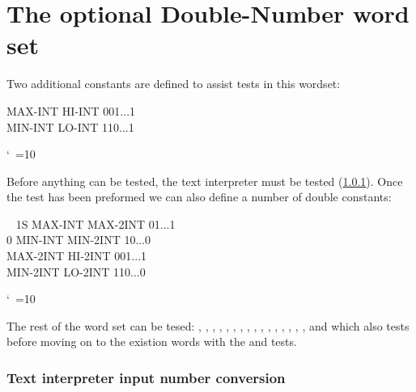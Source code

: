

\section{The optional Double-Number word set} %

\cbstart{}
Two additional constants are defined to assist tests in this wordset:

\begin{tt}\frenchspacing\obeyspaces
MAX-INT    HI-INT    001...1 \\
MIN-INT    LO-INT    110...1
\end{tt}
\nonfrenchspacing\catcode`\ =10

Before anything can be tested, the text interpreter must be
tested (\ref{test:dbl:in}).
Once the  test has been preformed
we can also define a number of double constants:

\begin{tt}\frenchspacing\obeyspaces
~     1S MAX-INT  MAX-2INT    01...1 \\\mbox{}
      0 MIN-INT  MIN-2INT    10...0 \\
MAX-2INT        HI-2INT     001...1 \\
MIN-2INT        LO-2INT     110...0
\end{tt}
\nonfrenchspacing\catcode`\ =10

The rest of the word set can be tesed:
,
, ,
, ,
, ,
, ,
, ,
, ,
, ,
,  and
 which also tests  before moving on
to the existion words with the
 and  tests.

\setcounter{subsection}{3}
\setcounter{subsubsection}{1}
\subsubsection{Text interpreter input number conversion}
\label{test:dbl:in}

